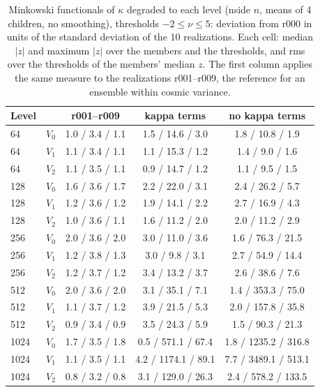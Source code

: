 \begin{table}
\caption{Minkowski functionals of $\kappa$ degraded to each level (nside $n$, means of 4 children, no smoothing), thresholds $-2\leq\nu\leq5$: deviation from r000 in units of the standard deviation of the 10 realizations. Each cell: median $|z|$ and maximum $|z|$ over the members and the thresholds, and rms over the thresholds of the members' median $z$. The first column applies the same measure to the realizations r001--r009, the reference for an ensemble within cosmic variance.}
\label{tab:mf_levels_n1024}
\centering\small
\begin{tabular}{llccc}
\hline\hline
Level &  & r001--r009 & kappa terms & no kappa terms \\
\hline
64 & $V_0$ & 1.0 / 3.4 / 1.1 & 1.5 / 14.6 / 3.0 & 1.8 / 10.8 / 1.9 \\
64 & $V_1$ & 1.1 / 3.4 / 1.1 & 1.1 / 15.3 / 1.2 & 1.4 / 9.0 / 1.6 \\
64 & $V_2$ & 1.1 / 3.5 / 1.1 & 0.9 / 14.7 / 1.2 & 1.1 / 9.5 / 1.5 \\
128 & $V_0$ & 1.6 / 3.6 / 1.7 & 2.2 / 22.0 / 3.1 & 2.4 / 26.2 / 5.7 \\
128 & $V_1$ & 1.2 / 3.6 / 1.2 & 1.9 / 14.1 / 2.2 & 2.7 / 16.9 / 4.3 \\
128 & $V_2$ & 1.0 / 3.6 / 1.1 & 1.6 / 11.2 / 2.0 & 2.0 / 11.2 / 2.9 \\
256 & $V_0$ & 2.0 / 3.6 / 2.0 & 3.0 / 11.0 / 3.6 & 1.6 / 76.3 / 21.5 \\
256 & $V_1$ & 1.2 / 3.8 / 1.3 & 3.0 / 9.8 / 3.1 & 2.7 / 54.9 / 14.4 \\
256 & $V_2$ & 1.2 / 3.7 / 1.2 & 3.4 / 13.2 / 3.7 & 2.6 / 38.6 / 7.6 \\
512 & $V_0$ & 2.0 / 3.6 / 2.0 & 3.1 / 35.1 / 7.1 & 1.4 / 353.3 / 75.0 \\
512 & $V_1$ & 1.1 / 3.7 / 1.2 & 3.9 / 21.5 / 5.3 & 2.0 / 157.8 / 35.8 \\
512 & $V_2$ & 0.9 / 3.4 / 0.9 & 3.5 / 24.3 / 5.9 & 1.5 / 90.3 / 21.3 \\
1024 & $V_0$ & 1.7 / 3.5 / 1.8 & 0.5 / 571.1 / 67.4 & 1.8 / 1235.2 / 316.8 \\
1024 & $V_1$ & 1.1 / 3.5 / 1.1 & 4.2 / 1174.1 / 89.1 & 7.7 / 3489.1 / 513.1 \\
1024 & $V_2$ & 0.8 / 3.2 / 0.8 & 3.1 / 129.0 / 26.3 & 2.4 / 578.2 / 133.5 \\
\hline
\end{tabular}
\end{table}
